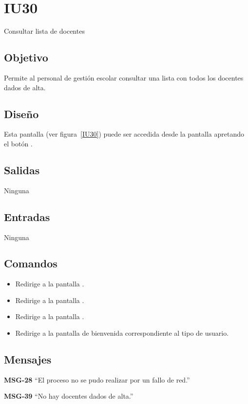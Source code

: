 
\section{IU30}{Consultar lista de docentes}
\subsection{Objetivo}
   Permite al personal de gestión escolar consultar una lista con todos los docentes dados de alta.
\subsection{Diseño}
    Esta pantalla  (ver figura~\ref{IU30}) puede ser accedida desde la pantalla  apretando el botón .

\subsection{Salidas}
Ninguna
\subsection{Entradas}
Ninguna
\subsection{Comandos}
\begin{itemize}
    \item {} Redirige a la pantalla .
    \item {} Redirige a la pantalla .
    \item {} Redirige a la pantalla .
    \item {} Redirige a la pantalla de bienvenida correspondiente al tipo de usuario.
    
\end{itemize}

\subsection{Mensajes}

\begin{Citemize}
    \item {\bf MSG-28}  ``El proceso no se pudo realizar por un fallo de red.''
    \item {\bf MSG-39}  ``No hay docentes dados de alta.''
\end{Citemize}


